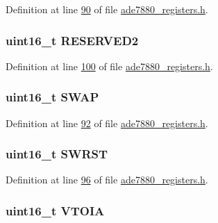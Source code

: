 Definition at line \hyperlink{a00036_source_l00090}{90} of file \hyperlink{a00036_source}{ade7880\-\_\-registers.\-h}.

\hypertarget{a00024_a5573848497a716a9947fd87487709feb}{
\subsubsection[{R\-E\-S\-E\-R\-V\-E\-D2}]{\setlength{\rightskip}{0pt plus 5cm}uint16\-\_\-t R\-E\-S\-E\-R\-V\-E\-D2}}\label{dc/de2/a00024_a5573848497a716a9947fd87487709feb}


Definition at line \hyperlink{a00036_source_l00100}{100} of file \hyperlink{a00036_source}{ade7880\-\_\-registers.\-h}.

\hypertarget{a00024_afda78ad6c50702ee69a4fd0447531eea}{
\subsubsection[{S\-W\-A\-P}]{\setlength{\rightskip}{0pt plus 5cm}uint16\-\_\-t S\-W\-A\-P}}\label{dc/de2/a00024_afda78ad6c50702ee69a4fd0447531eea}


Definition at line \hyperlink{a00036_source_l00092}{92} of file \hyperlink{a00036_source}{ade7880\-\_\-registers.\-h}.

\hypertarget{a00024_a4987fcca11694bd2ffae6a773a9bfc24}{
\subsubsection[{S\-W\-R\-S\-T}]{\setlength{\rightskip}{0pt plus 5cm}uint16\-\_\-t S\-W\-R\-S\-T}}\label{dc/de2/a00024_a4987fcca11694bd2ffae6a773a9bfc24}


Definition at line \hyperlink{a00036_source_l00096}{96} of file \hyperlink{a00036_source}{ade7880\-\_\-registers.\-h}.

\hypertarget{a00024_a71343161503bcee74a5b6e0fb0a5fac0}{
\subsubsection[{V\-T\-O\-I\-A}]{\setlength{\rightskip}{0pt plus 5cm}uint16\-\_\-t V\-T\-O\-I\-A}}\label{dc/de2/a00024_a71343161503bcee74a5b6e0fb0a5fac0}


